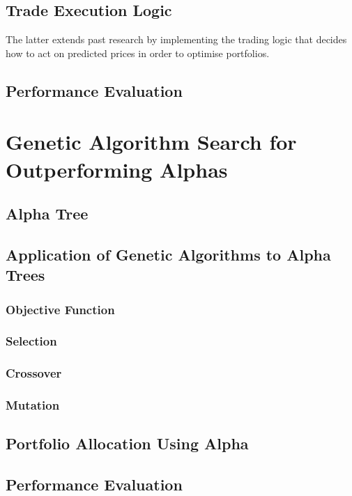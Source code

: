 \documentclass[a4paper,12pt]{report}
\renewcommand\thechapter{\Roman{chapter}}
\numberwithin{equation}{section}
\theoremstyle{definition}
\begin{document}
\subsection{Trade Execution Logic}
The latter extends past research by implementing the trading logic that decides how to act on predicted prices in order to optimise portfolios. 
\subsection{Performance Evaluation}
\section{Genetic Algorithm Search for Outperforming Alphas}
\subsection{Alpha Tree}
\subsection{Application of Genetic Algorithms to Alpha Trees}
\subsubsection{Objective Function}
\subsubsection{Selection}
\subsubsection{Crossover}
\subsubsection{Mutation}
\subsection{Portfolio Allocation Using Alpha}
\subsection{Performance Evaluation}

\titleformat{\chapter}[block]
  {\normalfont\huge\bfseries}{\thechapter.}{1em}{\Huge\centering}
\titlespacing*{\chapter}{0pt}{150pt}{0pt}
\setcounter{chapter}{2}
\renewcommand{\thechapter}{\Roman{chapter}}
\end{document}
